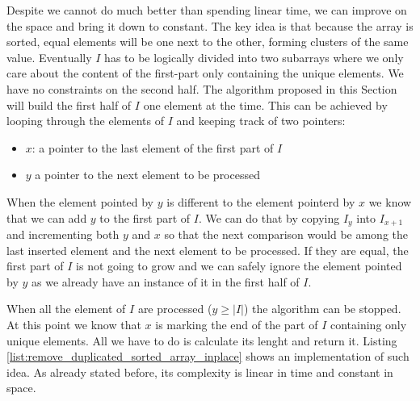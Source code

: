 Despite we cannot do much better than spending linear time, we can improve on the space and bring it down to constant.
The key idea is that because the array is sorted, equal elements will be one next to the other, forming clusters of the same value.
Eventually $I$ has to be logically divided into two subarrays where we only care about the content of the first-part only containing the unique elements. We have no constraints on the second half.
The algorithm proposed in this Section will build the first half of $I$ one element at the time.  This can be achieved by looping through the elements of $I$ and keeping track of two pointers:
\begin{itemize}
	\item $x$: a pointer to the last element of the first part of $I$
	\item $y$ a pointer to the next element to be processed 
\end{itemize}
When the element pointed by $y$ is different to the element pointerd by $x$ we know that we can add $y$ to the first part of $I$.
We can do that by copying $I_y$ into $I_{x+1}$ and incrementing both $y$ and $x$ so that the next comparison would be among the last inserted element and the next element to be processed.
If they are equal, the first part of $I$ is not going to grow and we can safely ignore the element pointed by $y$ as we already have an instance of it in the first half of $I$.

When all the element of $I$ are processed ($y \geq |I|$) the algorithm can be stopped. At this point we know that $x$ is marking the end of the part of $I$ containing only unique elements. All we have to do is calculate its lenght 
and return it.
Listing \ref{list:remove_duplicated_sorted_array_inplace} shows an implementation of such idea. As already stated before, its complexity is linear in time and constant in space.

\begin{minipage}{\linewidth}
	
\end{minipage}

